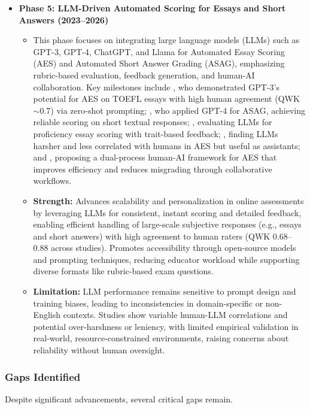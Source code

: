 \begin{itemize}
\item \sloppypar \textbf{Phase 5: LLM-Driven Automated Scoring for Essays and Short Answers (2023–2026)}
    \begin{itemize}
        \item This phase focuses on integrating large language models (LLMs) such as GPT-3, GPT-4, ChatGPT, and Llama for Automated Essay Scoring (AES) and Automated Short Answer Grading (ASAG), emphasizing rubric-based evaluation, feedback generation, and human-AI collaboration. Key milestones include \citet{MizumotoEguchi2023}, who demonstrated GPT-3's potential for AES on TOEFL essays with high human agreement (QWK $\sim$0.7) via zero-shot prompting; \citet{Schneider2024}, who applied GPT-4 for ASAG, achieving reliable scoring on short textual responses; \citet{Mansour2024}, evaluating LLMs for proficiency essay scoring with trait-based feedback; \citet{Kundu2024}, finding LLMs harsher and less correlated with humans in AES but useful as assistants; and \citet{Xiao2024}, proposing a dual-process human-AI framework for AES that improves efficiency and reduces misgrading through collaborative workflows.
        \item \textbf{Strength:} Advances scalability and personalization in online assessments by leveraging LLMs for consistent, instant scoring and detailed feedback, enabling efficient handling of large-scale subjective responses (e.g., essays and short answers) with high agreement to human raters (QWK 0.68–0.88 across studies). Promotes accessibility through open-source models and prompting techniques, reducing educator workload while supporting diverse formats like rubric-based exam questions.
        \item \textbf{Limitation:} LLM performance remains sensitive to prompt design and training biases, leading to inconsistencies in domain-specific or non-English contexts. Studies show variable human-LLM correlations and potential over-harshness or leniency, with limited empirical validation in real-world, resource-constrained environments, raising concerns about reliability without human oversight.
    \end{itemize}

\end{itemize}

\subsubsection{Gaps Identified}

Despite significant advancements, several critical gaps remain.

